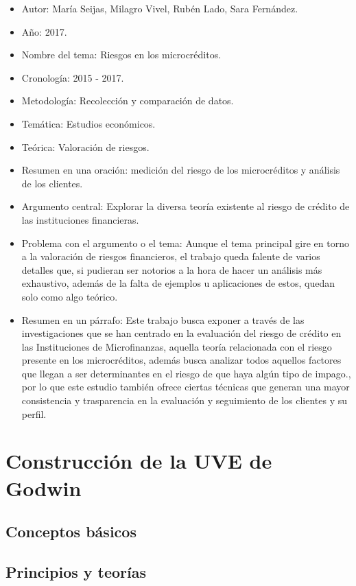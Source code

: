 \documentclass[
  letterpaper,
  DIV=11,
  numbers=noendperiod]{scrreprt}
\begin{document}
\begin{itemize}
\item
  Autor: María Seijas, Milagro Vivel, Rubén Lado, Sara Fernández.
\item
  Año: 2017.
\item
  Nombre del tema: Riesgos en los microcréditos.
\item
  Cronología: 2015 - 2017.
\item
  Metodología: Recolección y comparación de datos.
\item
  Temática: Estudios económicos.
\item
  Teórica: Valoración de riesgos.
\item
  Resumen en una oración: medición del riesgo de los microcréditos y
  análisis de los clientes.
\item
  Argumento central: Explorar la diversa teoría existente al riesgo de
  crédito de las instituciones financieras.
\item
  Problema con el argumento o el tema: Aunque el tema principal gire en
  torno a la valoración de riesgos financieros, el trabajo queda falente
  de varios detalles que, si pudieran ser notorios a la hora de hacer un
  análisis más exhaustivo, además de la falta de ejemplos u aplicaciones
  de estos, quedan solo como algo teórico.
\item
  Resumen en un párrafo: Este trabajo busca exponer a través de las
  investigaciones que se han centrado en la evaluación del riesgo de
  crédito en las Instituciones de Microfinanzas, aquella teoría
  relacionada con el riesgo presente en los microcréditos, además busca
  analizar todos aquellos factores que llegan a ser determinantes en el
  riesgo de que haya algún tipo de impago., por lo que este estudio
  también ofrece ciertas técnicas que generan una mayor consistencia y
  trasparencia en la evaluación y seguimiento de los clientes y su
  perfil.
\end{itemize}

\section{Construcción de la UVE de
Godwin}\label{construcciuxf3n-de-la-uve-de-godwin}

\subsection{Conceptos básicos}\label{conceptos-buxe1sicos}

\subsection{Principios y teorías}\label{principios-y-teoruxedas}
\end{document}
